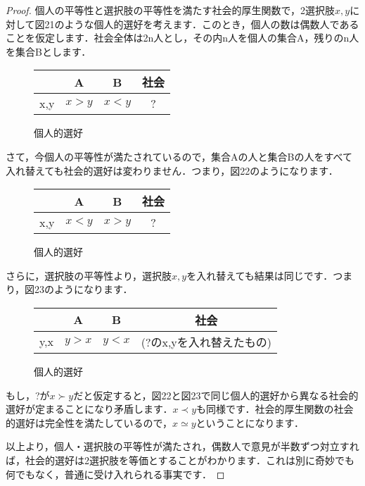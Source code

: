 \begin{proof}
個人の平等性と選択肢の平等性を満たす社会的厚生関数で，2選択肢$x,y$に対して図21のような個人的選好を考えます．このとき，個人の数は偶数人であることを仮定します．社会全体は2n人とし，その内n人を個人の集合A，残りのn人を集合Bとします．
\begin{figure}[!h]
    \centering
    \begin{tabular}[!h]{|c|c|c|c|} \hline
         & A & B & 社会 \\ \hline
        x,y & $x > y$ & $x < y$ & ? \\ \hline
    \end{tabular}
    \caption{個人的選好} 
\end{figure}
さて，今個人の平等性が満たされているので，集合Aの人と集合Bの人をすべて入れ替えても社会的選好は変わりません．つまり，図22のようになります．
\begin{figure}[!h]
    \centering
    \begin{tabular}[!h]{|c|c|c|c|} \hline
         & A & B & 社会 \\ \hline
        x,y & $x < y$ & $x > y$ & ? \\ \hline
    \end{tabular}
    \caption{個人的選好} 
\end{figure}
さらに，選択肢の平等性より，選択肢$x,y$を入れ替えても結果は同じです．つまり，図23のようになります．
\begin{figure}[!h]
    \centering
    \begin{tabular}[!h]{|c|c|c|c|} \hline
         & A & B & 社会 \\ \hline
        y,x & $y > x$ & $y < x$ & (?のx,yを入れ替えたもの) \\ \hline
    \end{tabular}
    \caption{個人的選好} 
\end{figure}

もし，?が$x \succ y$だと仮定すると，図22と図23で同じ個人的選好から異なる社会的選好が定まることになり矛盾します．$x \prec y$も同様です．社会的厚生関数の社会的選好は完全性を満たしているので，$x \simeq y$ということになります．

以上より，個人・選択肢の平等性が満たされ，偶数人で意見が半数ずつ対立すれば，社会的選好は2選択肢を等価とすることがわかります．これは別に奇妙でも何でもなく，普通に受け入れられる事実です．


\end{proof}
